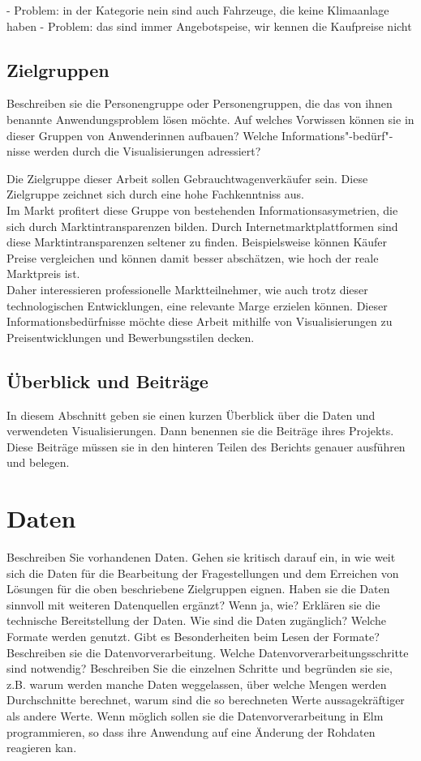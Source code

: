 \documentclass[usegeometry=true]{scrartcl}
\begin{document}
- Problem: in der Kategorie nein sind auch Fahrzeuge, die keine Klimaanlage haben
- Problem: das sind immer Angebotspeise, wir kennen die Kaufpreise nicht

\subsection{Zielgruppen}
Beschreiben sie die Personengruppe oder Personengruppen, die das von ihnen benannte Anwendungsproblem lösen möchte. Auf welches Vorwissen können sie in dieser Gruppen von Anwenderinnen aufbauen? Welche Informations"-bedürf"-nisse werden durch die Visualisierungen adressiert?

Die Zielgruppe dieser Arbeit sollen Gebrauchtwagenverkäufer sein. Diese Zielgruppe zeichnet sich durch eine hohe Fachkenntniss aus. \\
Im Markt profitert diese Gruppe von bestehenden Informationsasymetrien, die sich durch Marktintransparenzen bilden. Durch Internetmarktplattformen sind diese Marktintransparenzen seltener zu finden. Beispielsweise können Käufer Preise vergleichen und können damit besser abschätzen, wie hoch der reale Marktpreis ist. \\
Daher interessieren professionelle Marktteilnehmer, wie auch trotz dieser technologischen Entwicklungen, eine relevante Marge erzielen können. 
Dieser Informationsbedürfnisse möchte diese Arbeit mithilfe von Visualisierungen zu Preisentwicklungen und Bewerbungsstilen decken. \\


\subsection{Überblick und Beiträge}
In diesem Abschnitt geben sie einen kurzen Überblick über die Daten und verwendeten Visualisierungen. Dann benennen sie die Beiträge ihres Projekts. Diese Beiträge müssen sie in den hinteren Teilen des Berichts genauer ausführen und belegen.

\section{Daten}
Beschreiben Sie vorhandenen Daten. Gehen sie kritisch darauf ein, in wie weit sich die Daten für die Bearbeitung der Fragestellungen und dem Erreichen von Lösungen für die oben beschriebene Zielgruppen eignen. Haben sie die Daten sinnvoll mit weiteren Datenquellen ergänzt? Wenn ja, wie?
Erklären sie die technische Bereitstellung der Daten.
Wie sind die Daten zugänglich? Welche Formate werden genutzt. Gibt es Besonderheiten beim Lesen der Formate?
Beschreiben sie die Datenvorverarbeitung.
Welche Datenvorverarbeitungsschritte sind notwendig? Beschreiben Sie die einzelnen Schritte und begründen sie sie, z.B. warum werden manche Daten weggelassen, über welche Mengen werden Durchschnitte berechnet, warum sind die so berechneten Werte aussagekräftiger als andere Werte. Wenn möglich sollen sie die Datenvorverarbeitung in Elm programmieren, so dass ihre Anwendung auf eine Änderung der Rohdaten reagieren kan. 
\end{document}
